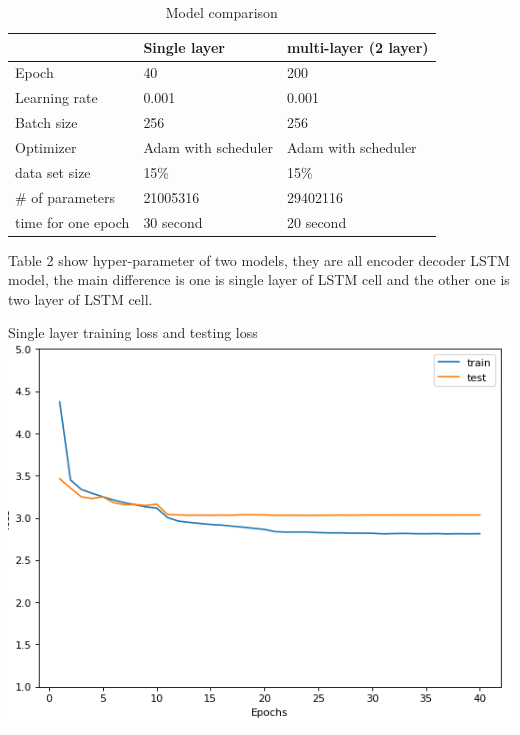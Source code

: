 \documentclass{article}
\begin{document}
\begin{table}[H]
  \caption{Model comparison}
  \label{model comparsion}
  \centering
  \begin{tabular}{lll}
    \toprule
    \cmidrule(r){1-2}
     & Single layer    & multi-layer (2 layer)    \\
    \midrule
    Epoch    &  40      &  200      \\
    Learning rate        &     0.001     &  0.001     \\
    Batch size &        256        &          256 \\
    Optimizer&  Adam with scheduler & Adam with scheduler\\
    data set size & 15\%              & 15\%    \\
    \# of parameters &  21005316 &         29402116  \\
    time for one epoch &    30 second            & 20 second \\
    \bottomrule
  \end{tabular}
\end{table}
Table 2 show hyper-parameter of two models, they are all encoder decoder LSTM model, the main difference is one is single layer of LSTM cell and the other one is two layer of LSTM cell.


\begin{center}
    Single layer training loss and testing loss 
    \includegraphics[scale=0.7]{single_loss.png}
\end{center}
\end{document}

